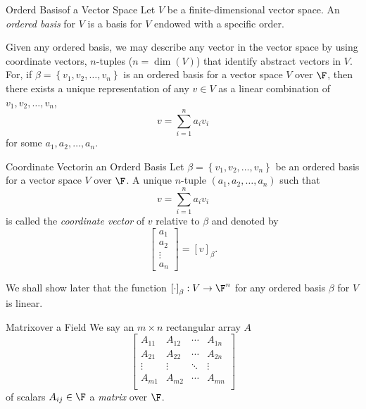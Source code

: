 \documentclass[linearalgebra]{subfiles}
\begin{document}
    \begin{definition}{Orderd Basis}{of a Vector Space}
        Let $V$ be a finite-dimensional vector space. An \emph{ordered basis} for $V$ is a basis for $V$ endowed with a specific order.
    \end{definition}

    \begin{remark}
        Given any ordered basis, we may describe any vector in the vector space by using coordinate vectors, $n$-tuples ($n = \dim(V)$) that identify abstract vectors in $V$. For, if $\beta = \left\lbrace v_1, v_2, \ldots, v_n \right\rbrace$ is an ordered basis for a vector space $V$ over $\F$, then there exists a unique representation of any $v\in V$ as a linear combination of $v_1,v_2,\ldots,v_n$,
        \begin{equation*}
            v = \sum^{n}_{i=1} a_iv_i
        \end{equation*}
        for some $a_1,a_2,\ldots,a_n$.
    \end{remark}

    \begin{definition}{Coordinate Vector}{in an Orderd Basis}
        Let $\beta = \left\lbrace v_1, v_2, \ldots, v_n \right\rbrace$ be an ordered basis for a vector space $V$ over $\F$. A unique $n$-tuple $(a_1, a_2, \ldots, a_n)$ such that
        \begin{equation*}
            v = \sum^n_{i=1} a_iv_i
        \end{equation*}
        is called the \emph{coordinate vector} of $v$ relative to $\beta$ and denoted by
        \begin{equation*}
            \begin{bmatrix} a_1 \\ a_2 \\ \vdots \\ a_n \end{bmatrix} = \left[ v \right]_\beta.
        \end{equation*}
    \end{definition}

    \begin{remark}
        We shall show later that the function $\left[ \cdot \right] _\beta:V\to\F^n$ for any ordered basis $\beta$ for $V$ is linear.
    \end{remark}

    \begin{definition}{Matrix}{over a Field}
        We say an $m\times n$ rectangular array $A$
        \begin{equation*}
            \begin{bmatrix}
                A_{11} & A_{12} & \cdots & A_{1n} \\
                A_{21} & A_{22} & \cdots & A_{2n} \\
                \vdots & \vdots & \ddots & \vdots \\
                A_{m1} & A_{m2} & \cdots & A_{mn}\\
            \end{bmatrix}
        \end{equation*}
        of scalars $A_{ij}\in\F$ a \emph{matrix} over $\F$.
    \end{definition}
\end{document}
